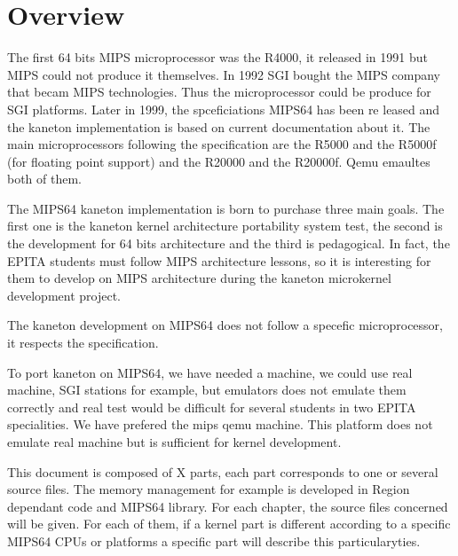 %
%
%
%
%
%

%
%

\chapter{Overview}

The first 64 bits MIPS microprocessor was the R4000, it released in 1991 but MIPS could not produce it themselves. In 1992 SGI bought the MIPS company that becam MIPS technologies. Thus the microprocessor could be produce for SGI platforms. Later in 1999, the spceficiations MIPS64 has been re
leased and the kaneton implementation is based on current documentation about it. The main microprocessors following the specification are the R5000 and the R5000f (for floating point support) and the R20000 and the R20000f. Qemu emaultes both of them.

The MIPS64 kaneton implementation is born to purchase three main goals.
The first one is the kaneton kernel architecture portability system test,
the second is the development for 64 bits architecture and the third is pedagogical.
In fact, the EPITA students must follow MIPS architecture lessons, so it is interesting 
for them to develop on MIPS architecture during the kaneton microkernel development
project.

The kaneton development on MIPS64 does not follow a specefic microprocessor, it respects the specification.

To port kaneton on MIPS64, we have needed a machine, we could use real machine, SGI stations for example, but emulators does not emulate them correctly and real test would be difficult for several students in two EPITA specialities. We have prefered the mips qemu machine. This platform does not emulate real machine but is sufficient for kernel development.

This document is composed of X parts, each part corresponds to one or several source files. The memory management for example is developed in Region dependant code and MIPS64 library. For each chapter, the source files concerned will be given.
For each of them, if a kernel part is different according to a specific MIPS64 CPUs or platforms a specific part will describe this particularyties.
